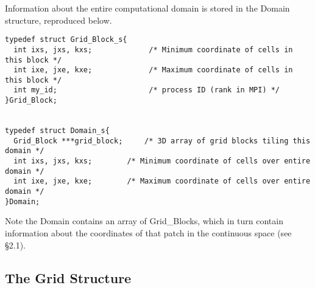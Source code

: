 Information about the entire computational domain is stored in the
Domain structure, reproduced below.
\footnotesize
\begin{verbatim}
typedef struct Grid_Block_s{
  int ixs, jxs, kxs;             /* Minimum coordinate of cells in this block */
  int ixe, jxe, kxe;             /* Maximum coordinate of cells in this block */
  int my_id;                     /* process ID (rank in MPI) */
}Grid_Block;


typedef struct Domain_s{
  Grid_Block ***grid_block;     /* 3D array of grid blocks tiling this domain */
  int ixs, jxs, kxs;        /* Minimum coordinate of cells over entire domain */
  int ixe, jxe, kxe;        /* Maximum coordinate of cells over entire domain */
}Domain;
\end{verbatim}
\normalsize
Note the Domain contains an array of Grid\_Blocks, which in turn contain
information about the coordinates of that patch in the continuous space
(see \S2.1).

\subsection{The Grid Structure}

